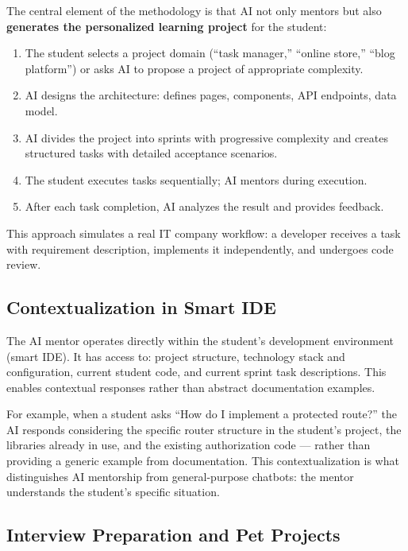 \documentclass[conference,a4paper]{IEEEtran}
\begin{document}
The central element of the methodology is that AI not only mentors but also \textbf{generates the personalized learning project} for the student:

\begin{enumerate}
\item The student selects a project domain (``task manager,'' ``online store,'' ``blog platform'') or asks AI to propose a project of appropriate complexity.
\item AI designs the architecture: defines pages, components, API endpoints, data model.
\item AI divides the project into sprints with progressive complexity and creates structured tasks with detailed acceptance scenarios.
\item The student executes tasks sequentially; AI mentors during execution.
\item After each task completion, AI analyzes the result and provides feedback.
\end{enumerate}

This approach simulates a real IT company workflow: a developer receives a task with requirement description, implements it independently, and undergoes code review.

\subsection{Contextualization in Smart IDE}

The AI mentor operates directly within the student's development environment (smart IDE). It has access to: project structure, technology stack and configuration, current student code, and current sprint task descriptions. This enables contextual responses rather than abstract documentation examples.

For example, when a student asks ``How do I implement a protected route?'' the AI responds considering the specific router structure in the student's project, the libraries already in use, and the existing authorization code --- rather than providing a generic example from documentation. This contextualization is what distinguishes AI mentorship from general-purpose chatbots: the mentor understands the student's specific situation.

\subsection{Interview Preparation and Pet Projects}
\end{document}
